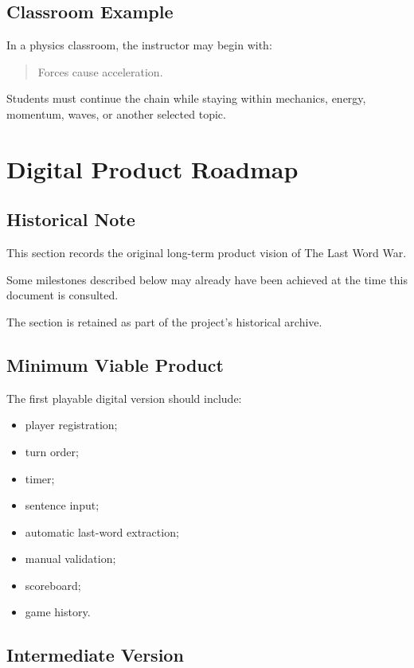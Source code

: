 \documentclass[11pt,a4paper]{article}
\begin{document}
\subsection{Classroom Example}

In a physics classroom, the instructor may begin with:

\begin{quote}
Forces cause acceleration.
\end{quote}

Students must continue the chain while staying within mechanics, energy, momentum, waves, or another selected topic.

\section{Digital Product Roadmap}

\subsection{Historical Note}

This section records the original long-term product vision of
The Last Word War\texttrademark.

Some milestones described below may already have been achieved
at the time this document is consulted.

The section is retained as part of the project's historical archive.

\subsection{Minimum Viable Product}

The first playable digital version should include:

\begin{itemize}
    \item player registration;
    \item turn order;
    \item timer;
    \item sentence input;
    \item automatic last-word extraction;
    \item manual validation;
    \item scoreboard;
    \item game history.
\end{itemize}

\subsection{Intermediate Version}
\end{document}
